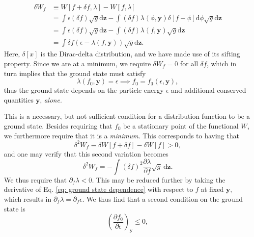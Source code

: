\begin{equation*}
\begin{aligned}
    \delta W_f &\equiv W[f+ \delta f,\lambda]-W[f,\lambda] \\
    &= \int \epsilon (\delta f) \sqrt{g} \mathrm{d} \boldsymbol{z} - \int (\delta f) \lambda(\phi,\boldsymbol{y}) \delta[f - \phi] \mathrm{d} \phi \sqrt{g} \mathrm{d} \boldsymbol{z}  \\
    &= \int \epsilon (\delta f) \sqrt{g} \mathrm{d} \boldsymbol{z} - \int(\delta f) \lambda(f,\boldsymbol{y}) \sqrt{g} \mathrm{d} \boldsymbol{z} \\
    &= \int \delta f \left( \epsilon - \lambda(f,\boldsymbol{y}) \right) \sqrt{g} \mathrm{d} \boldsymbol{z}.
\end{aligned}
\end{equation*}
Here, $\delta[x]$ is the Dirac-delta distribution, and we have made use of its sifting property. Since we are at a minimum, we require $\delta W_f=0$ for all $\delta f$, which in turn implies that the ground state must satisfy
\begin{equation}
     \lambda(f_0,\boldsymbol{y})=\epsilon \implies f_0 = f_0(\epsilon,\boldsymbol{y}),
     \label{eq: ground state dependence}
\end{equation}
thus the ground state depends on the particle energy $\epsilon$ and additional conserved quantities $\boldsymbol{y}$, \textit{alone.} \par
This is a necessary, but not sufficient condition for a distribution function to be a ground state. Besides requiring that $f_0$ be a stationary point of the functional $W$, we furthermore require that it is a \textit{minimum}. This corresponds to having that
\begin{equation}
    \delta^2 W_f \equiv \delta W[f+ \delta f] - \delta W[f] > 0,
\end{equation}
and one may verify that this second variation becomes
\begin{equation}
    \delta^2 W_f = - \int (\delta f)^2 \frac{\partial \lambda}{\partial f} \sqrt{g} \: \mathrm{d} \boldsymbol{z}.
\end{equation}
We thus require that $\partial_f \lambda < 0$. This may be reduced further by taking the derivative of Eq. \eqref{eq: ground state dependence} with respect to $f$ at fixed $\boldsymbol{y}$, which results in $\partial_f \lambda = \partial_f \epsilon$. We thus find that a second condition on the ground state is
\begin{equation}
     \left(\frac{\partial f_0}{\partial \epsilon} \right)_{\boldsymbol{y}} \leq 0,
\end{equation}
